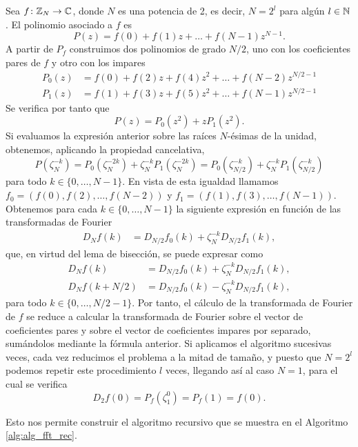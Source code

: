 \documentclass{article}
\begin{document}
Sea $f \colon \mathbb{Z}_N \to \mathbb{C}$, donde $N$ es una potencia de 2, es decir, $N = 2^l$ para algún $l \in \mathbb{N}$. El polinomio asociado a $f$ es
\[ P(z) = f(0) + f(1)z + \dots + f(N-1)z^{N-1}. \]
A partir de $P_f$ construimos dos polinomios de grado $N/2$, uno con los coeficientes pares de $f$ y otro con los impares
\begin{align*}
    {P_0}(z) & = f(0) + f(2)z + f(4)z^2 + \dots + f(N-2)z^{N/2-1} \\
    {P_1}(z) & = f(1) + f(3)z + f(5)z^2 + \dots + f(N-1)z^{N/2-1}
\end{align*}
Se verifica por tanto que
\[ P(z) = {P_0}(z^2) + z{P_1}(z^2). \]
Si evaluamos la expresión anterior sobre las raíces $N$-ésimas de la unidad, obtenemos, aplicando la propiedad cancelativa,
\[ P(\zeta_N^{-k}) = {P_0}(\zeta_N^{-2k}) + \zeta_N^{-k}{P_1}(\zeta_N^{-2k}) = {P_0}(\zeta_{N/2}^{-k}) + \zeta_N^{-k}{P_1}(\zeta_{N/2}^{-k})\]
para todo $k \in \{0,\dots, N-1\}$. %
En vista de esta igualdad llamamos $f_0 = (f(0),f(2),\dots,f(N-2))$ y $f_1 = (f(1),f(3),\dots,f(N-1))$. Obtenemos para cada $k \in \{0,\dots, N-1\}$ la siguiente expresión en función de las transformadas de Fourier
\begin{align} 
    D_Nf(k) &= D_{N/2}f_0(k) + \zeta_N^{-k}D_{N/2}f_1(k),
\end{align}
que, en virtud del lema de bisección, se puede expresar como
\begin{equation} \label{eq:rec_fft}
\begin{aligned}
    D_Nf(k) &= D_{N/2}f_0(k) + \zeta_N^{-k}D_{N/2}f_1(k), \\
    D_Nf(k+N/2) &= D_{N/2}f_0(k) - \zeta_N^{-k}D_{N/2}f_1(k),
\end{aligned}
\end{equation}
para todo $k \in \{0,\dots, N/2-1\}$. Por tanto, el cálculo de la transformada de Fourier de $f$ se reduce a calcular la transformada de Fourier sobre el vector de coeficientes pares y sobre el vector de coeficientes impares por separado, sumándolos mediante la fórmula anterior. Si aplicamos el algoritmo sucesivas veces, cada vez reducimos el problema a la mitad de tamaño, y puesto que $N = 2^l$ podemos repetir este procedimiento $l$ veces, llegando así al caso $N = 1$, para el cual se verifica  
\[ D_2f(0) = P_f(\zeta_1^0) = P_f(1) = f(0) .\]

Esto nos permite construir el algoritmo recursivo que se muestra en el Algoritmo \ref{alg:alg_fft_rec}.
\end{document}
